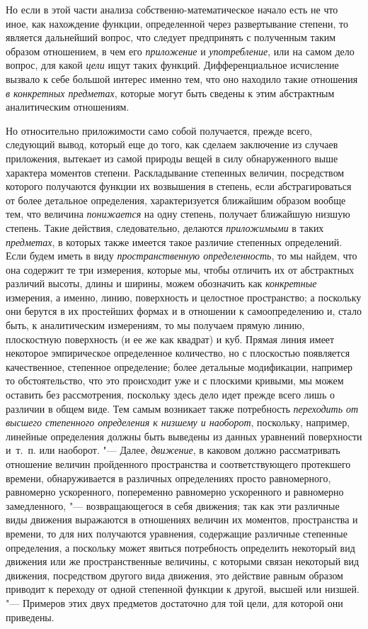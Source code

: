 Но если в этой части анализа собственно-математическое начало есть не что
иное, как нахождение функции, определенной через развертывание степени, то
является дальнейший вопрос, что следует предпринять с полученным таким
образом отношением, в чем его {\em приложение} и
{\em употребление}, или на самом дело вопрос, для какой
{\em цели} ищут таких функций. Дифференциальное
исчисление вызвало к себе большой интерес именно тем, что оно находило
такие отношения {\em в конкретных предметах}, которые
могут быть сведены к этим абстрактным аналитическим отношениям.

Но относительно приложимости само собой получается, прежде всего, следующий
вывод, который еще до того, как сделаем заключение из случаев приложения,
вытекает из самой природы вещей в силу обнаруженного выше характера
моментов степени. Раскладывание степенных величин, посредством которого
получаются функции их возвышения в степень, если абстрагироваться от более
детальное определения, характеризуется ближайшим образом вообще тем, что
величина {\em понижается} на одну степень, получает
ближайшую низшую степень. Такие действия, следовательно, делаются
{\em приложимыми} в таких
{\em предметах}, в которых также имеется такое различие
степенных определений. Если будем иметь в виду
{\em пространственную определенность}, то мы найдем,
что она содержит те три измерения, которые мы, чтобы отличить их от
абстрактных различий высоты, длины и ширины, можем обозначить как
{\em конкретные} измерения, а именно, линию,
поверхность и целостное пространство; а поскольку они берутся в их
простейших формах и в отношении к самоопределению и, стало быть, к
аналитическим измерениям, то мы получаем прямую линию, плоскостную
поверхность (и ее же как квадрат) и куб. Прямая линия имеет некоторое
эмпирическое определенное количество, но с плоскостью появляется
качественное, степенное определение; более детальные модификации, например
то обстоятельство, что это происходит уже и с плоскими кривыми, мы можем
оставить без рассмотрения, поскольку здесь дело идет прежде всего лишь о
различии в общем виде. Тем самым возникает также потребность
{\em переходить от высшего степенного определения к
низшему и наоборот}, поскольку, например, линейные определения должны быть
выведены из данных уравнений поверхности и~т.~п. или наоборот. "--- Далее,
{\em движение}, в каковом должно рассматривать
отношение величин пройденного пространства и соответствующего протекшего
времени, обнаруживается в различных определениях просто равномерного,
равномерно ускоренного, попеременно равномерно ускоренного и равномерно
замедленного, "--- возвращающегося в себя движения; так как эти различные виды
движения выражаются в отношениях величин их моментов, пространства и
времени, то для них получаются уравнения, содержащие различные степенные
определения, а поскольку может явиться потребность определить некоторый вид
движения или же пространственные величины, с которыми связан некоторый вид
движения, посредством другого вида движения, это действие равным образом
приводит к переходу от одной степенной функции к другой, высшей или низшей.
"--- Примеров этих двух предметов достаточно для той цели, для которой они
приведены.

